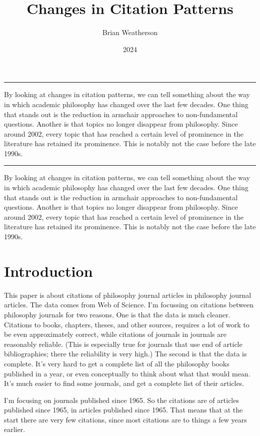 \documentclass[
  10pt,
  letterpaper,
  DIV=11,
  numbers=noendperiod,
  twoside]{scrartcl}
\title{Changes in Citation Patterns}
\author{Brian Weatherson}
\date{2024}
\renewenvironment{abstract}
 {\vspace{-1.25cm}
 \quotation\small\noindent\rule{\linewidth}{.5pt}\par\smallskip
 \noindent }
 {\par\noindent\rule{\linewidth}{.5pt}\endquotation}
\begin{document}
\maketitle
\begin{abstract}
By looking at changes in citation patterns, we can tell something about
the way in which academic philosophy has changed over the last few
decades. One thing that stands out is the reduction in armchair
approaches to non-fundamental questions. Another is that topics no
longer disappear from philosophy. Since around 2002, every topic that
has reached a certain level of prominence in the literature has retained
its prominence. This is notably not the case before the late 1990s.
\end{abstract}


By looking at changes in citation patterns, we can tell something about
the way in which academic philosophy has changed over the last few
decades. One thing that stands out is the reduction in armchair
approaches to non-fundamental questions. Another is that topics no
longer disappear from philosophy. Since around 2002, every topic that
has reached a certain level of prominence in the literature has retained
its prominence. This is notably not the case before the late 1990s.

\section{Introduction}\label{sec-introduction}

This paper is about citations of philosophy journal articles in
philosophy journal articles. The data comes from Web of Science. I'm
focussing on citations between philosophy journals for two reasons. One
is that the data is much cleaner. Citations to books, chapters, theses,
and other sources, requires a lot of work to be even approximately
correct, while citations of journals in journals are reasonably
reliable. (This is especially true for journals that use end of article
bibliographies; there the reliability is very high.) The second is that
the data is complete. It's very hard to get a complete list of all the
philosophy books published in a year, or even conceptually to think
about what that would mean. It's much easier to find some journals, and
get a complete list of their articles.

I'm focusing on journals published since 1965. So the citations are of
articles published since 1965, in articles published since 1965. That
means that at the start there are very few citations, since most
citations are to things a few years earlier.
\end{document}
